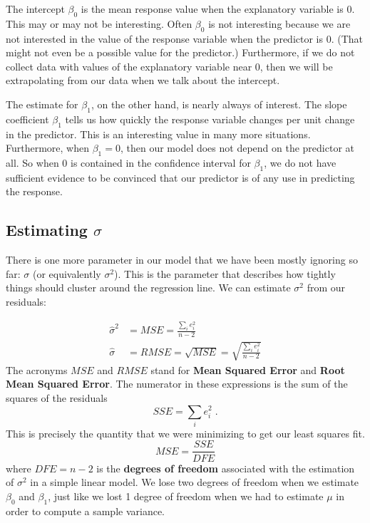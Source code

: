 \documentclass[twoside]{book}\usepackage[]{graphicx}\usepackage[]{xcolor}
\def\term#1{\textbf{#1}}
\begin{document}
The intercept $\beta_0$ is the mean response value when the 
explanatory variable is 0.  This may or may not be interesting.
Often $\beta_0$ is not interesting because we are not interested
in the value of the response variable when the predictor is 0.  (That might not 
even be a possible value for the predictor.)  Furthermore, 
if we do not collect data with values of the explanatory variable near 0, then
we will be extrapolating from our data when we talk about the intercept.

The estimate for $\beta_1$, on the other hand, is nearly always of interest.
The slope coefficient $\beta_1$ tells us how quickly the response variable changes 
per unit change in the predictor.  This is an interesting value in many more situations.
Furthermore, when $\beta_1 = 0$, then our model does not depend on the predictor at all.
So when 0 is contained in the confidence interval for $\beta_1$, we do not have sufficient 
evidence to be convinced that our predictor is of any use in predicting the response.

\subsection{Estimating $\sigma$}

There is one more parameter in our model that we have been mostly ignoring so far: $\sigma$ (or 
equivalently $\sigma^2$).  This is the parameter that describes how tightly things should 
cluster around the regression line.  We can estimate $\sigma^2$ from our residuals:

\begin{align*}
\hat\sigma^2 & = MSE = \frac{ \sum_i e_i^2 }{ n -2 }
\\
\hat\sigma & = RMSE = \sqrt{MSE} = \sqrt{\frac{ \sum_i e_i^2 }{ n -2 } }
\end{align*}
The acronyms $MSE$ and $RMSE$ stand for \term{Mean Squared Error} and 
\term{Root Mean Squared Error}.
The numerator in these expressions is the sum of the squares of the residuals
\[
SSE = \sum_i e_i^2 \;.
\]
This is precisely the quantity that we were minimizing to get our least squares fit.
\[
MSE = \frac{SSE}{DFE} 
\]
where $DFE = n-2$ is the \term{degrees of freedom} associated with the
estimation of $\sigma^2$ in a simple linear model.  We lose two degrees of
freedom when we estimate $\beta_0$ and $\beta_1$, just like we lost 1 degree of
freedom when we had to estimate $\mu$ in order to compute a sample variance.
\end{document}
